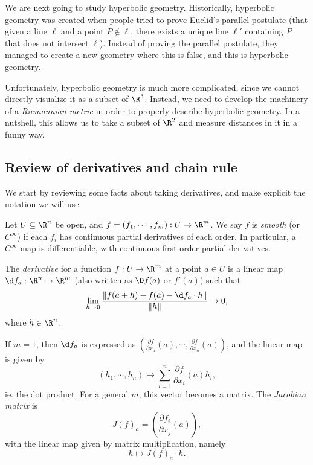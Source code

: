 \documentclass[a4paper]{article}
\begin{document}
We are next going to study hyperbolic geometry. Historically, hyperbolic geometry was created when people tried to prove Euclid's parallel postulate (that given a line $\ell$ and a point $P \not\in \ell$, there exists a unique line $\ell'$ containing $P$ that does not intersect $\ell$). Instead of proving the parallel postulate, they managed to create a new geometry where this is false, and this is hyperbolic geometry.

Unfortunately, hyperbolic geometry is much more complicated, since we cannot directly visualize it as a subset of $\R^3$. Instead, we need to develop the machinery of a \emph{Riemannian metric} in order to properly describe hyperbolic geometry. In a nutshell, this allows us to take a subset of $\R^2$ and measure distances in it in a funny way.

\subsection{Review of derivatives and chain rule}
We start by reviewing some facts about taking derivatives, and make explicit the notation we will use.

\begin{defi}
  Let $U \subseteq \R^n$ be open, and $f = (f_1, \cdots, f_m): U \to \R^m$. We say $f$ is \emph{smooth} (or $C^\infty$) if each $f_i$ has continuous partial derivatives of each order. In particular, a $C^\infty$ map is differentiable, with continuous first-order partial derivatives.
\end{defi}

\begin{defi}[Derivative]
  The \emph{derivative} for a function $f: U \to \R^m$ at a point $a \in U$ is a linear map $\d f_a: \R^n \to \R^m$ (also written as $\D f(a)$ or $f'(a)$) such that
  \[
    \lim_{h \to 0} \frac{\|f(a + h) - f(a) - \d f_a \cdot h\|}{\|h\|} \to 0,
  \]
  where $h \in \R^n$.

  If $m = 1$, then $\d f_a$ is expressed as $\left(\frac{\partial f}{\partial x_a}(a), \cdots, \frac{\partial f}{\partial x_n}(a)\right)$, and the linear map is given by
  \[
    (h_1, \cdots, h_n) \mapsto \sum_{i = 1}^n \frac{\partial f}{\partial x_i}(a) h_i,
  \]
  ie. the dot product. For a general $m$, this vector becomes a matrix. The \emph{Jacobian matrix} is
  \[
    J(f)_a = \left(\frac{\partial f_i}{\partial x_j}(a)\right),
  \]
  with the linear map given by matrix multiplication, namely
  \[
    h \mapsto J(f)_a \cdot h.
  \]
\end{defi}
\end{document}
